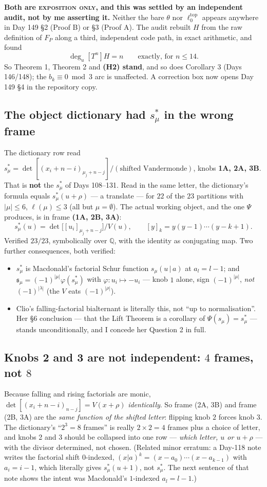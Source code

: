 \documentclass[11pt,a4paper]{article}
\newcommand{\ltop}{\ell^{\mathrm{top}}}
\newcommand{\Q}{\mathbb{Q}}
\theoremstyle{plain}
\theoremstyle{definition}
\begin{document}
\noindent\textbf{Both are \textsc{exposition only}, and this was settled by an independent
audit, not by me asserting it.} Neither the bare $\theta$ nor $\ltop_0$ appears anywhere in
Day 149 \S2 (Proof B) or \S3 (Proof A). The audit rebuilt $H$ from the raw definition of
$F_P$ along a third, independent code path, in exact arithmetic, and found
\[
\deg_u[T^n]H=n\qquad\text{exactly, for } n\le14 .
\]
So Theorem 1, Theorem 2 and \textbf{(H2) stand}, and so does Corollary 3 (Days 146/148); the
$b_k\equiv0\bmod3$ arc is unaffected. A correction box now opens Day 149 \S4 in the
repository copy.

\subsection{The object dictionary had $s^*_\mu$ in the wrong frame}

The dictionary row read
$s^*_\mu=\det[(x_i+n-i)_{\mu_j+n-j}]/(\text{shifted Vandermonde})$, knobs \textbf{1A, 2A, 3B}.
That is \textbf{not} the $s^*_\mu$ of Days 108--131. Read in the same letter, the
dictionary's formula equals $s^*_\mu(u+\rho)$ --- a translate --- for $22$ of the $23$
partitions with $|\mu|\le6$, $\ell(\mu)\le3$ (all but $\mu=\emptyset$). The actual working
object, and the one $\Psi$ produces, is in frame \textbf{(1A, 2B, 3A)}:
\[
s^*_\mu(u)=\det\bigl[[u_i]_{\mu_j+n-j}\bigr]\big/V(u),\qquad [y]_k=y(y-1)\cdots(y-k+1).
\]
Verified $23/23$, symbolically over $\Q$, with the identity as conjugating map. Two further
consequences, both verified:
\begin{itemize}
\item $s^*_\mu$ is Macdonald's factorial Schur function $s_\mu(u\,|\,a)$ at $a_l=l-1$; and
$\mathfrak s_\mu=(-1)^{|\mu|}\varphi(s^*_\mu)$ with $\varphi:u_i\mapsto-u_i$ --- knob $1$
alone, sign $(-1)^{|\mu|}$, \emph{not} $(-1)^{|\lambda|}$ (the $V$ eats $(-1)^{|\rho|}$).
\item Clio's falling-factorial bialternant is literally this, not ``up to normalisation''.
Her \S6 conclusion --- that the Lift Theorem is a corollary of $\Psi(s_\mu)=s^*_\mu$ ---
stands unconditionally, and I concede her Question 2 in full.
\end{itemize}

\subsection{Knobs 2 and 3 are not independent: $4$ frames, not $8$}

Because falling and rising factorials are monic, $\det[(x_i+n-i)_{n-j}]=V(x+\rho)$
\emph{identically}. So frame (2A, 3B) and frame (2B, 3A) are the \emph{same function of the
shifted letter}: flipping knob $2$ forces knob $3$. The dictionary's ``$2^3=8$ frames'' is
really $2\times2=4$ frames plus a choice of letter, and knobs 2 and 3 should be collapsed
into one row --- \emph{which letter, $u$ or $u+\rho$} --- with the divisor determined, not
chosen. (Related minor erratum: a Day-118 note writes the factorial shift $0$-indexed,
$(x|a)^k=(x-a_0)\cdots(x-a_{k-1})$ with $a_i=i-1$, which literally gives $s^*_\mu(u+1)$,
not $s^*_\mu$. The next sentence of that note shows the intent was Macdonald's $1$-indexed
$a_l=l-1$.)
\end{document}

